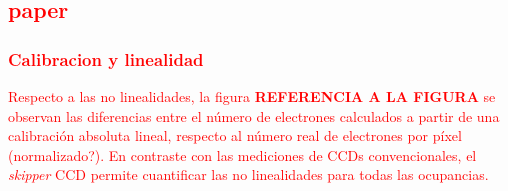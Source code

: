 \textcolor{red}{%
\subsection{paper}
%
\subsubsection{Calibracion y linealidad}
\indent Respecto a las no linealidades, la figura \textbf{REFERENCIA A LA FIGURA} se observan las diferencias entre el número de electrones calculados a partir de una calibración absoluta lineal, respecto al número real de electrones por píxel (normalizado?). En contraste con las mediciones de CCDs convencionales, el \textit{skipper} CCD permite cuantificar las no linealidades para todas las ocupancias.
%
}
